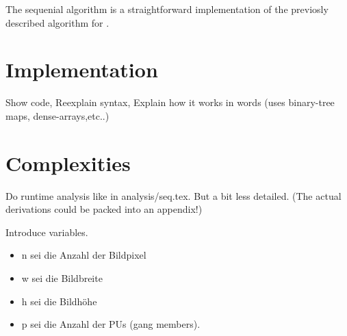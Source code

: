 


The sequenial algorithm is a straightforward implementation of the previosly
described algorithm for \algo.

\section{Implementation}
  Show code,
  Reexplain syntax,
  Explain how it works in words (uses binary-tree maps, dense-arrays,etc..)
  
\section{Complexities}
  Do runtime analysis like in analysis/seq.tex. But a bit less detailed.
  (The actual derivations could be packed into an appendix!)
  
  
  Introduce variables.
  \begin{itemize}
    \item n sei die Anzahl der Bildpixel
    \item w sei die Bildbreite
    \item h sei die Bildhöhe
    \item p sei die Anzahl der PUs (gang members).
  \end{itemize}
